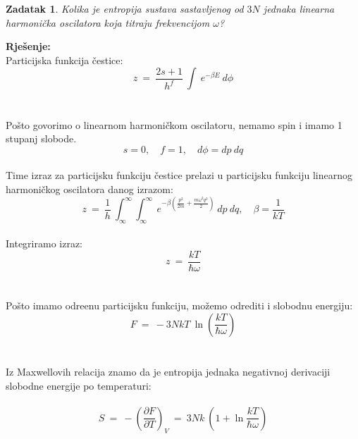 \documentclass[a4paper,12pt]{article}
\newtheorem{ZDK}{Zadatak}[section]
\begin{document}
\newpage
\begin{ZDK}
	Kolika je entropija sustava sastavljenog od $3N$ jednaka linearna harmoni\v{c}ka oscilatora koja titraju frekvencijom $\omega$?
\end{ZDK}
\textbf{Rje\v{s}enje:} \\
\newline
Particijska funkcija \v{c}estice:
\\
$$ z\ =\ \frac{2s+1}{h^f}\ \int\ e^{-\beta E}\ d\phi $$
\\
\\
Po\v{s}to govorimo o linearnom harmoni\v{c}kom oscilatoru, nemamo spin i imamo 1 stupanj slobode. 
$$ s=0, \quad f=1, \quad d\phi=dp\ dq $$
\\
Time izraz za particijsku funkciju \v{c}estice prelazi u particijsku funkciju linearnog harmoni\v{c}kog oscilatora danog izrazom:
\\
$$ z\ =\ \frac{1}{h}\ \int_{\infty}^{\infty}\int_{\infty}^{\infty}\ e^{-\beta\left( \frac{p^2}{2m}+\frac{m\omega^2q^2}{2} \right)}\ dp\ dq, \quad \beta=\frac{1}{kT} $$
\\
Integriramo izraz:
\\
$$ z\ =\ \frac{kT}{\hbar\omega} $$
\\
\\
Po\v{s}to imamo odre\dj enu particijsku funkciju, mo\v{z}emo odrediti i slobodnu energiju:
\\
$$ F\ =\ -3NkT\ \ln{\left( \frac{kT}{\hbar\omega} \right)} $$
\\
\\
Iz Maxwellovih relacija znamo da je entropija jednaka negativnoj derivaciji slobodne energije po temperaturi:
\\
\\
$$ S\ =\ -\left( \frac{\partial F}{\partial T} \right)_V\ =\ 3Nk\ \left( 1+\ln{\frac{kT}{\hbar\omega}} \right) $$
\end{document}

